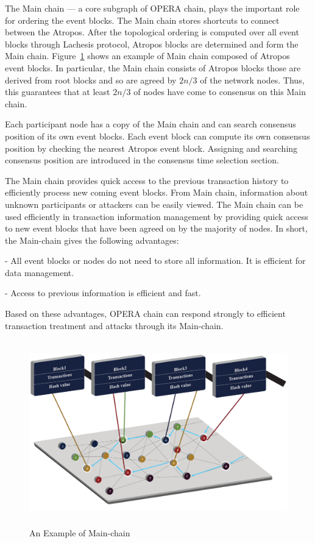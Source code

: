 \documentclass[preprint,12pt]{elsarticle}
\begin{document}
The Main chain --- a core subgraph of OPERA chain, plays the important role for ordering the event blocks. The Main chain stores shortcuts to connect between the Atropos. 
After the topological ordering is computed over all event blocks through Lachesis protocol, Atropos blocks are determined and form the Main chain.  
Figure~\ref{fig:mainchain} shows an example of Main chain composed of Atropos event blocks. 
In particular, the Main chain consists of Atropos blocks those are derived from root blocks and so are agreed by $2n/3$ of the network nodes. Thus, this guarantees that at least $2n/3$ of nodes have come to consensus on this Main chain. 

Each participant node has a copy of the Main chain and can search consensus position of its own event blocks.
Each event block can compute its own consensus position by checking the nearest Atropos event block. Assigning and searching consensus position are introduced in the consensus time selection section. 

  

The Main chain provides quick access to the previous transaction history to efficiently process new coming event blocks. From Main chain,  information about unknown participants or attackers can be easily viewed.
The Main chain can be used efficiently in transaction information management by providing quick access to new event blocks that have been agreed on by the majority of nodes. In short, the Main-chain gives the following advantages:

-	All event blocks or nodes do not need to store all information. It is efficient for data management.

-	Access to previous information is efficient and fast.

Based on these advantages, OPERA chain can respond strongly to efficient transaction treatment and attacks through its Main-chain.


\begin{figure} [H] \centering  
	\includegraphics[height=8cm, width=1.0\columnwidth]{mainchain}
	\caption{An Example of Main-chain}
	\label{fig:mainchain}
\end{figure}
\end{document}
